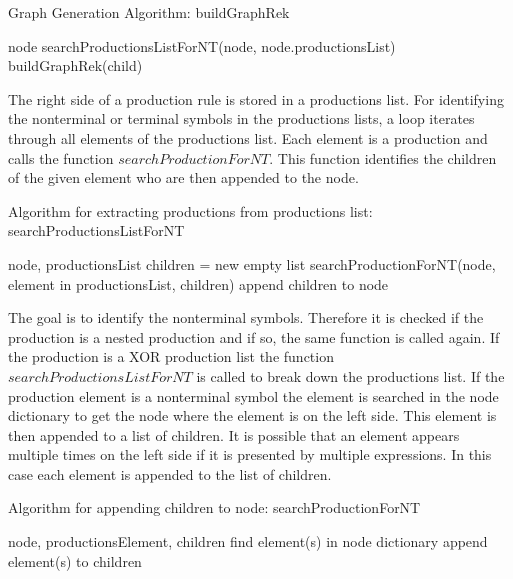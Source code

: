 \begin{algorithm}[H]
\caption{Graph Generation Algorithm: buildGraphRek}
\begin{algorithmic}[1] 
\Require node
\State searchProductionsListForNT(node, node.productionsList)
		\State buildGraphRek(child)
	\EndFor
\EndIf
\end{algorithmic}
\end{algorithm}

The right side of a production rule is stored in a productions list.
For identifying the nonterminal or terminal symbols in the productions lists, a loop iterates through all elements of the productions list.
Each element is a production and calls the function $searchProductionForNT$.
This function identifies the children of the given element who are then appended to the node.

\begin{algorithm}[H]
\caption{Algorithm for extracting productions from productions list: searchProductionsListForNT}
\begin{algorithmic}[1] 
\Require node, productionsList
	\State children = new empty list
	\State searchProductionForNT(node, element in productionsList, children)
	\State append children to node
\EndFor
\end{algorithmic}
\end{algorithm}

The goal is to identify the nonterminal symbols.
Therefore it is checked if the production is a nested production and if so, the same function is called again.
If the production is a XOR production list the function $searchProductionsListForNT$ is called to break down the productions list.
If the production element is a nonterminal symbol the element is searched in the node dictionary to get the node where the element is on the left side.
This element is then appended to a list of children. It is possible that an element appears multiple times on the left side if it is presented by multiple expressions.
In this case each element is appended to the list of children.

\begin{algorithm}[H]
\caption{Algorithm for appending children to node: searchProductionForNT}
\begin{algorithmic}[1] 
\Require node, productionsElement, children
		\State find element(s) in node dictionary
		\State append element(s) to children
	\EndIf
\EndFor
\end{algorithmic}
\end{algorithm}
